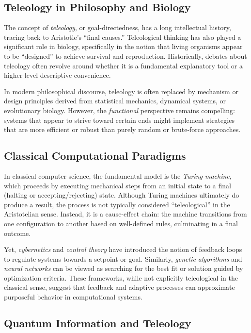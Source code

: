 \documentclass[12pt]{article}
\begin{document}
\subsection{Teleology in Philosophy and Biology}

The concept of \emph{teleology}, or goal-directedness, has a long intellectual history, tracing back to Aristotle's ``final causes.'' Teleological thinking has also played a significant role in biology, specifically in the notion that living organisms appear to be ``designed'' to achieve survival and reproduction. Historically, debates about teleology often revolve around whether it is a fundamental explanatory tool or a higher-level descriptive convenience.

In modern philosophical discourse, teleology is often replaced by mechanism or design principles derived from statistical mechanics, dynamical systems, or evolutionary biology. However, the \emph{functional} perspective remains compelling: systems that appear to strive toward certain ends might implement strategies that are more efficient or robust than purely random or brute-force approaches.

\subsection{Classical Computational Paradigms}

In classical computer science, the fundamental model is the \emph{Turing machine}, which proceeds by executing mechanical steps from an initial state to a final (halting or accepting/rejecting) state. Although Turing machines ultimately do produce a result, the process is not typically considered ``teleological'' in the Aristotelian sense. Instead, it is a cause-effect chain: the machine transitions from one configuration to another based on well-defined rules, culminating in a final outcome.

Yet, \emph{cybernetics} and \emph{control theory} have introduced the notion of feedback loops to regulate systems towards a setpoint or goal. Similarly, \emph{genetic algorithms} and \emph{neural networks} can be viewed as searching for the best fit or solution guided by optimization criteria. These frameworks, while not explicitly teleological in the classical sense, suggest that feedback and adaptive processes can approximate purposeful behavior in computational systems.

\subsection{Quantum Information and Teleology}
\end{document}

